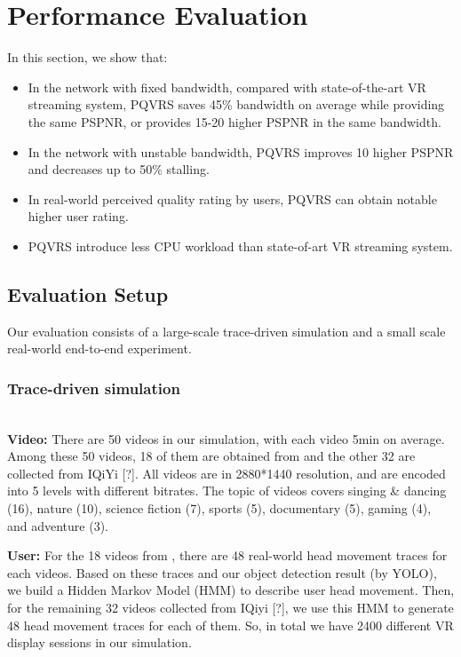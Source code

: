\section{Performance Evaluation}

In this section, we show that:

\begin{itemize}

\item In the network with fixed bandwidth, compared with state-of-the-art VR streaming system, PQVRS saves 45\% bandwidth on average while providing the same PSPNR, or provides 15-20 higher PSPNR in the same bandwidth.

\item In the network with unstable bandwidth, PQVRS improves 10 higher PSPNR and decreases up to 50\% stalling.

\item In real-world perceived quality rating by users, PQVRS can obtain notable higher user rating.

\item PQVRS introduce less CPU workload than state-of-art VR streaming system.

\end{itemize}

\subsection{Evaluation Setup}

Our evaluation consists of a large-scale trace-driven simulation and a small scale real-world end-to-end experiment.

\subsubsection{Trace-driven simulation}
~\\

\textbf{Video: } There are 50 videos in our simulation, with each video 5min on average. Among these 50 videos, 18 of them are obtained from \cite{VRdataset} and the other 32 are collected from IQiYi [?]. All videos are in 2880*1440 resolution, and are encoded into 5 levels with different bitrates. The topic of videos covers singing \& dancing (16), nature (10), science fiction (7), sports (5), documentary (5), gaming (4), and adventure (3).

\textbf{User: } For the 18 videos from \cite{VRdataset}, there are 48 real-world head movement traces for each videos. Based on these traces and our object detection result (by YOLO), we build a Hidden Markov Model (HMM) to describe user head movement. Then, for the remaining 32 videos collected from IQiyi [?], we use this HMM to generate 48 head movement traces for each of them. So, in total we have 2400 different VR display sessions in our simulation.

